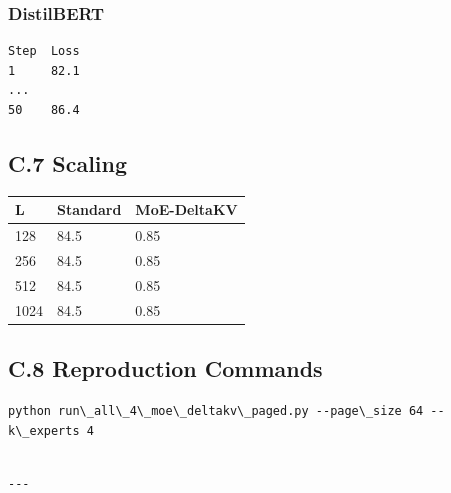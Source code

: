 \subsubsection{DistilBERT}
\begin{lstlisting}
Step  Loss
1     82.1
...
50    86.4
\end{lstlisting}

\subsection{C.7 Scaling}

\begin{table}[H]
\centering
\small
\begin{tabular}{lll}
\toprule
\textbf{L} & \textbf{Standard} & \textbf{MoE-DeltaKV} \\
\midrule
128 & 84.5 & 0.85 \\
256 & 84.5 & 0.85 \\
512 & 84.5 & 0.85 \\
1024 & 84.5 & 0.85 \\
\bottomrule
\end{tabular}
\end{table}

\subsection{C.8 Reproduction Commands}

\begin{lstlisting}
python run\_all\_4\_moe\_deltakv\_paged.py --page\_size 64 --k\_experts 4
\end{lstlisting}
\begin{lstlisting}

---
\end{lstlisting}